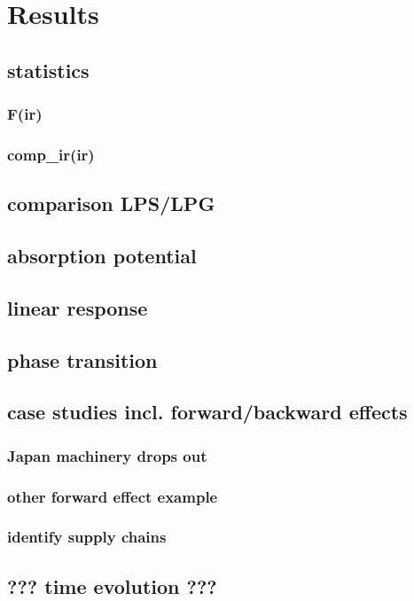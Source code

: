 \chapter{Results}

\section{statistics}

\subsection{F(ir)}  

\subsection{comp\_ir(ir)}

\section{comparison LPS/LPG} 

\section{absorption potential}

\section{linear response}

\section{phase transition}

\section{case studies incl. forward/backward effects}

\subsection{Japan machinery drops out}

\subsection{other forward effect example}

\subsection{identify supply chains}

\section{??? time evolution ???}